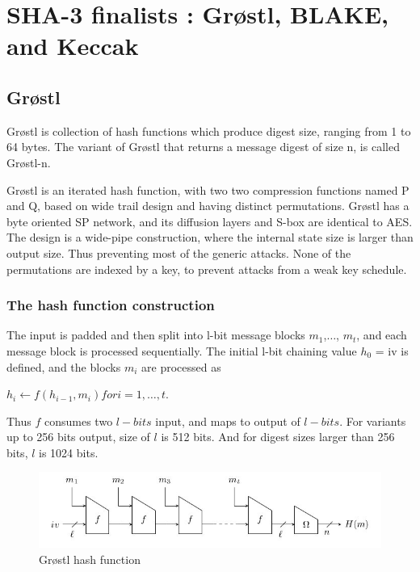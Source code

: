\chapter{SHA-3 finalists : Gr{\o}stl, BLAKE, and Keccak}

\section{Gr{\o}stl}

Gr{\o}stl is collection of hash functions which produce digest size, ranging from 1 to 64 bytes. The variant of
Gr{\o}stl that returns a message digest of size n, is called Gr{\o}stl-n.

Gr{\o}stl is an iterated hash function, with two two compression functions named P and Q, based on wide trail design
and having distinct permutations. Gr{\o}stl has a byte oriented SP network, and its diffusion layers and S-box 
are identical to AES. The design is a wide-pipe construction, where the internal state size is larger than output 
size. Thus preventing most of the generic attacks. None of the permutations are indexed by a key, to prevent attacks
from a weak key schedule. \cite{00019}

  \subsection{The hash function construction}

  The input is padded and then split into l-bit message blocks $m_{1}$,$\ldots$, $m_{t}$, and each message block is
  processed sequentially. The initial l-bit chaining value $h_{0}$ = iv is defined, and the blocks $m_{i}$ are
  processed as 

  \begin{center}$ h_{i}\gets f(h_{i-1}, m_{i}) for i = 1,\ldots, t.$\end{center}

  Thus $f$ consumes two $l-bits$ input, and maps to output of $l-bits$. For variants up to 256 bits output, size of $l$ is
  512 bits. And for digest sizes larger than 256 bits, $l$ is 1024 bits.

  \begin{figure}
    \begin{center}
      \includegraphics[width=5.5in]{groestlhashfunction.jpg}
    \end{center}
    \caption{Gr{\o}stl hash function \cite{00019}}
    \label{fig:lab}
  \end{figure}

